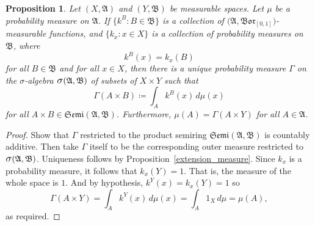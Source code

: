\documentclass[
twoside=true,
paper=letter,
fontsize=9pt,
pagesize=auto,
leqno,
openany,
headsepline,
overfullrule,
]{scrbook}
\theoremstyle{plain}
\theoremstyle{plain}
\newtheorem{prop}[thm]{Proposition}
\theoremstyle{definition}
\theoremstyle{bfnoteitalic}
\theoremstyle{bfnoteroman}
\newcommand{\sigalg}[1]{\mathfrak{#1}}
\newcommand{\definedby}{\coloneqq}
\newcommand{\borel}{\mathfrak{Bor}}
\newcommand{\sagb}{\mathop{\hbox{\large{$\sigma$}}}\nolimits}
\newcommand{\textsigma}{\hbox{\large{$\sigma$}}\kern-1pt}
\newcommand{\sigmaalgebra}{\sigalg{A}}
\newcommand{\sigmaalgebraii}{\sigalg{B}}
\newcommand{\productsemiring}[2]{\mathfrak{Semi}(#1,#2)}
\newcommand{\funck}{k}
\newcommand{\measurespace}{X}
\newcommand{\measurespaceii}{Y}
\newcommand{\mspaceelt}{x}
\newcommand{\measure}{\mu}
\newcommand{\seti}{A}
\newcommand{\setii}{B}
\newcommand{\measonprod}{\Gamma}%
\begin{document}
\begin{prop}\label{not_a_product_measure}
Let
$(\measurespace, \sigmaalgebra)$ and 
$(\measurespaceii, \sigmaalgebraii)$ be measurable spaces.
Let $\measure$ be a probability measure on $\sigmaalgebra$.
If
$\{ \funck^\setii : \setii\in\sigmaalgebraii \}$
is a collection of
$\bigl(\sigmaalgebra, \borel_{[0,1]}\bigr)$\hyp{}measurable functions,
and
$\{ \funck_\mspaceelt : \mspaceelt\in\measurespace \}$
is a collection of probability measures on $\sigmaalgebraii$,
where
\[
\funck^\setii (\mspaceelt) = \funck_\mspaceelt (\setii)
\]
for all
$\setii\in\sigmaalgebraii$
and for all
$\mspaceelt\in\measurespace$,
then there is a unique probability measure $\measonprod$ on the \textsigma-algebra 
$\sagb(\sigmaalgebra,\sigmaalgebraii)$ of subsets of 
$\measurespace\times\measurespaceii$
such that
\[
\measonprod(\seti\times\setii)
\definedby
\int_\seti \funck^\setii(\mspaceelt) \, d\measure(\mspaceelt)
\]
for all $\seti\times\setii\in\productsemiring{\sigmaalgebra}{\sigmaalgebraii}$.
Furthermore,
$\measure(\seti) = \measonprod(\seti\times\measurespaceii)$ for all $\seti\in\sigmaalgebra$.
\end{prop}


\begin{proof}
Show that  $\measonprod$ restricted to the product semiring
$\productsemiring{\sigmaalgebra}{\sigmaalgebraii}$ is countably additive.
Then take $\measonprod$ itself to be the corresponding outer measure restricted to 
$\sagb(\sigmaalgebra,\sigmaalgebraii)$. 
Uniqueness follows by Proposition~\ref{extension_measure}.
Since $\funck_\mspaceelt$ is a probability measure, it follows that
$\funck_\mspaceelt(\measurespaceii) = 1$. That is, the measure of the whole space is $1$.
And by hypothesis,
$\funck^\measurespaceii(\mspaceelt)
=
\funck_\mspaceelt(\measurespaceii)
= 1$
so
\[
\measonprod(\seti\times\measurespaceii)
=
\int_\seti \funck^\measurespaceii (\mspaceelt)
\, d\measure(\mspaceelt)
=
\int_\seti 1_\measurespace \, d\measure
=\measure(\seti),
\]
as required.
\end{proof}
\end{document}
